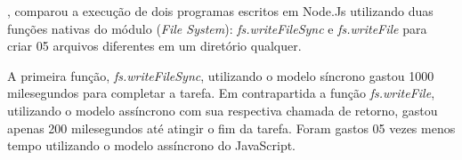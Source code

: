   , comparou a execução de dois programas escritos em Node.Js utilizando duas funções nativas
  do módulo (\textit{File System}): \textit{fs.writeFileSync} e \textit{fs.writeFile} para criar 05 arquivos diferentes 
  em um diretório qualquer.
  
  A primeira função, \textit{fs.writeFileSync}, utilizando o modelo síncrono gastou 1000 milesegundos para completar a tarefa. 
  Em contrapartida a função \textit{fs.writeFile}, utilizando o modelo assíncrono com sua respectiva chamada de retorno, gastou
  apenas 200 milesegundos até atingir o fim da tarefa. Foram gastos 05 vezes menos tempo utilizando o modelo assíncrono do JavaScript.
  
  
  

 


